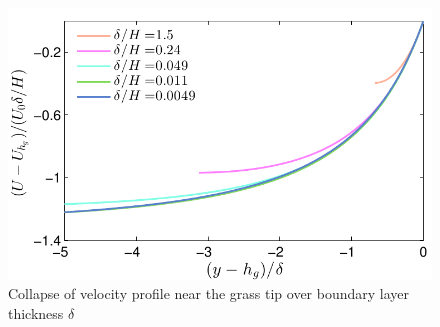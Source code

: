 \documentclass[12pt]{report}   %
\begin{document}
\begin{figure}
\centerline{\includegraphics[]{Grass_shear_scale_collapse} }
\caption{
Collapse of velocity profile near the grass tip over boundary layer thickness $\delta$  
}
\label{base_collapse}
\end{figure}
\end{document}
